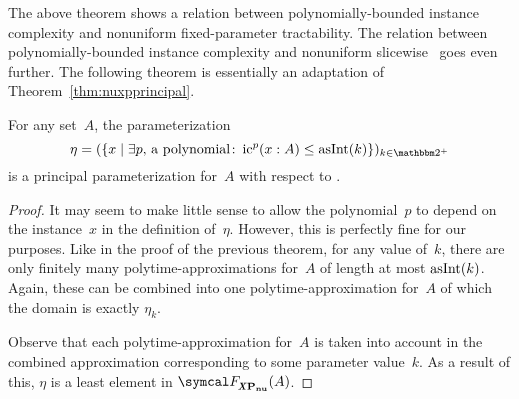 The above theorem shows a relation between polynomially-bounded instance complexity and nonuniform fixed-parameter tractability.
The relation between polynomially-bounded instance complexity and nonuniform slicewise~ goes even further.
The following theorem is essentially an adaptation of Theorem~\ref{thm:nuxpprincipal}.
\begin{theorem}
\label{thm:nuxpic}%
  For any set~$A$, the parameterization
  \begin{equation*}
   \eta \deq (\{x \st \exists p\text{, a polynomial}\colon \ic^p(x : A) \le \asNat(k)\})_{k \in \binary^+}
  \end{equation*}
  is a principal parameterization for~$A$ with respect to .
\end{theorem}
\begin{proof}
  It may seem to make little sense to allow the polynomial~$p$ to depend on the instance~$x$ in the definition of~$\eta$.
  However, this is perfectly fine for our purposes.
  Like in the proof of the previous theorem, for any value of~$k$, there are only finitely many polytime-approximations for~$A$ of length at most $\operatorname{asInt}(k)$.
  Again, these can be combined into one polytime-approximation for~$A$ of which the domain is exactly $\eta_k$.

  Observe that each polytime-approximation for~$A$ is taken into account in the combined approximation corresponding to some parameter value~$k$.
  As a result of this, $\eta$ is a least element in $\calF_\clXnu{P}(A)$.
\end{proof}

